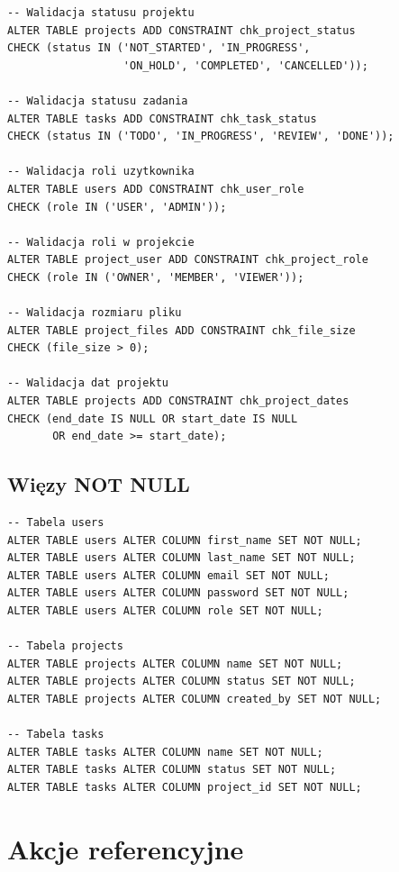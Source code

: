 \documentclass[12pt,a4paper]{report}
\begin{document}
\begin{lstlisting}[style=sqlstyle, caption={Więzy CHECK}]
-- Walidacja statusu projektu
ALTER TABLE projects ADD CONSTRAINT chk_project_status 
CHECK (status IN ('NOT_STARTED', 'IN_PROGRESS', 
                  'ON_HOLD', 'COMPLETED', 'CANCELLED'));

-- Walidacja statusu zadania
ALTER TABLE tasks ADD CONSTRAINT chk_task_status 
CHECK (status IN ('TODO', 'IN_PROGRESS', 'REVIEW', 'DONE'));

-- Walidacja roli uzytkownika
ALTER TABLE users ADD CONSTRAINT chk_user_role 
CHECK (role IN ('USER', 'ADMIN'));

-- Walidacja roli w projekcie
ALTER TABLE project_user ADD CONSTRAINT chk_project_role 
CHECK (role IN ('OWNER', 'MEMBER', 'VIEWER'));

-- Walidacja rozmiaru pliku
ALTER TABLE project_files ADD CONSTRAINT chk_file_size 
CHECK (file_size > 0);

-- Walidacja dat projektu
ALTER TABLE projects ADD CONSTRAINT chk_project_dates 
CHECK (end_date IS NULL OR start_date IS NULL 
       OR end_date >= start_date);
\end{lstlisting}

\subsection{Więzy NOT NULL}

\begin{lstlisting}[style=sqlstyle, caption={Więzy NOT NULL}]
-- Tabela users
ALTER TABLE users ALTER COLUMN first_name SET NOT NULL;
ALTER TABLE users ALTER COLUMN last_name SET NOT NULL;
ALTER TABLE users ALTER COLUMN email SET NOT NULL;
ALTER TABLE users ALTER COLUMN password SET NOT NULL;
ALTER TABLE users ALTER COLUMN role SET NOT NULL;

-- Tabela projects
ALTER TABLE projects ALTER COLUMN name SET NOT NULL;
ALTER TABLE projects ALTER COLUMN status SET NOT NULL;
ALTER TABLE projects ALTER COLUMN created_by SET NOT NULL;

-- Tabela tasks
ALTER TABLE tasks ALTER COLUMN name SET NOT NULL;
ALTER TABLE tasks ALTER COLUMN status SET NOT NULL;
ALTER TABLE tasks ALTER COLUMN project_id SET NOT NULL;
\end{lstlisting}

\section{Akcje referencyjne}
\end{document}
